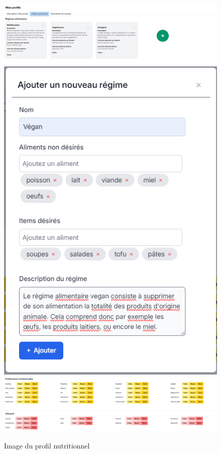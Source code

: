 \documentclass[11pt]{article}
\begin{document}
\begin{figure}[H]
\includegraphics[scale=0.4]{images/diet_profile.png} \\

\includegraphics[scale=0.5]{images/add_new_diet.png} \\

\includegraphics[scale=0.5]{images/preferences_allergenes.png} \\

\caption{Image du profil nutritionnel}
\end{figure}
\end{document}
